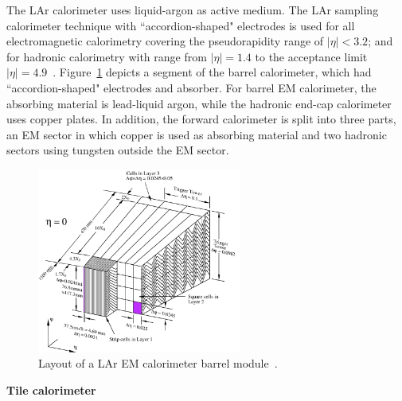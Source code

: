 The LAr calorimeter uses liquid-argon as active medium.
The LAr sampling calorimeter technique with ``accordion-shaped" electrodes is used for all electromagnetic calorimetry covering the pseudorapidity range of $|\eta|<3.2$;
and for hadronic calorimetry with range from $|\eta| = 1.4$ to the acceptance limit $|\eta| = 4.9$~\cite{CERN-LHCC-96-041}.
Figure~\ref{fig:calo_lar} depicts a segment of the barrel calorimeter, which had ``accordion-shaped" electrodes and absorber.
For barrel EM calorimeter, the absorbing material is lead-liquid argon, while the hadronic end-cap calorimeter uses copper plates.
In addition, the forward calorimeter is split into three parts, an EM sector in which copper is used as absorbing material and two hadronic sectors using tungsten outside the EM sector.
\begin{figure}[!htb]
  \centering
  \includegraphics[width=0.6\textwidth]{figures/Detector/calo_lar.png}
  \caption{Layout of a LAr EM calorimeter barrel module~\cite{CERN-LHCC-96-041}.}
  \label{fig:calo_lar}
\end{figure}

\textbf{Tile calorimeter}


